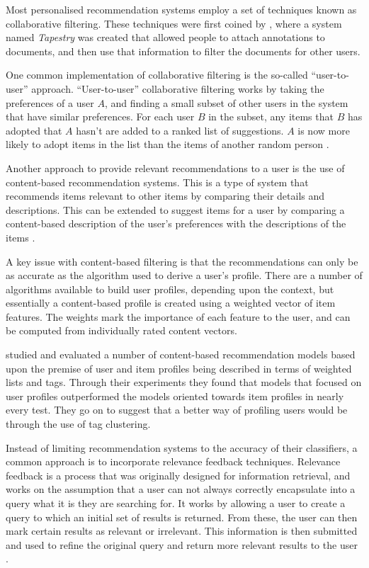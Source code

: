 \documentclass[11pt,a4paper]{report}
\begin{document}
Most personalised recommendation systems employ a set of techniques known as collaborative filtering. These techniques were first coined by \textcite{Goldberg:1992}, where a system named \emph{Tapestry} was created that allowed people to attach annotations to documents, and then use that information to filter the documents for other users.

One common implementation of collaborative filtering is the so-called ``user-to-user'' approach. ``User-to-user'' collaborative filtering works by taking the preferences of a user $A$, and finding a small subset of other users in the system that have similar preferences. For each user $B$ in the subset, any items that $B$ has adopted that $A$ hasn't are added to a ranked list of suggestions. $A$ is now more likely to adopt items in the list than the items of another random person \parencite{Schafer:2001}.

Another approach to provide relevant recommendations to a user is the use of content-based recommendation systems. This is a type of system that recommends items relevant to other items by comparing their details and descriptions. This can be extended to suggest items for a user by comparing a content-based description of the user's preferences with the descriptions of the items \parencite{Pazzani:2007}.

A key issue with content-based filtering is that the recommendations can only be as accurate as the algorithm used to derive a user's profile. There are a number of algorithms available to build user profiles, depending upon the context, but essentially a content-based profile is created using a weighted vector of item features. The weights mark the importance of each feature to the user, and can be computed from individually rated content vectors.

\textcite{Cantador:2010} studied and evaluated a number of content-based recommendation models based upon the premise of user and item profiles being described in terms of weighted lists and tags. Through their experiments they found that models that focused on user profiles outperformed the models oriented towards item profiles in nearly every test. They go on to suggest that a better way of profiling users would be through the use of tag clustering.

Instead of limiting recommendation systems to the accuracy of their classifiers, a common approach is to incorporate relevance feedback techniques. Relevance feedback is a process that was originally designed for information retrieval, and works on the assumption that a user can not always correctly encapsulate into a query what it is they are searching for. It works by allowing a user to create a query to which an initial set of results is returned. From these, the user can then mark certain results as relevant or irrelevant. This information is then submitted and used to refine the original query and return more relevant results to the user \parencite{Salton:1990}.
\end{document}
